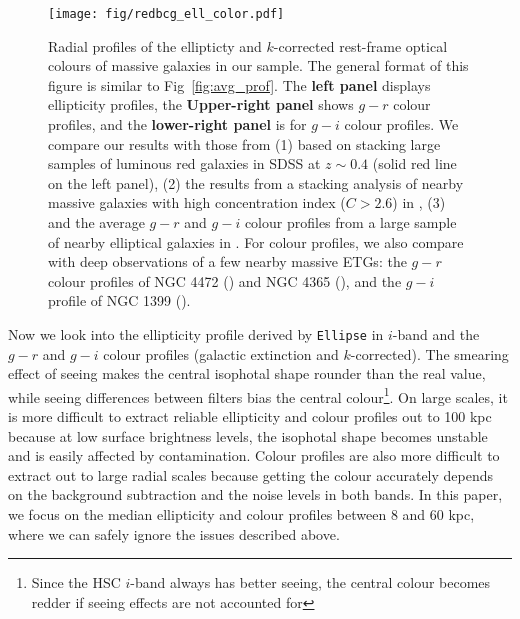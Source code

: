 \documentclass[fleqn,usenatbib]{mnras}
\begin{document}
  \begin{figure}
      \centering 
      \texttt{[image: fig/redbcg\_ell\_color.pdf]}
      \caption{
          Radial profiles of the ellipticty and $k$-corrected rest-frame optical colours 
          of massive galaxies in our sample. 
          The general format of this figure is similar to Fig~\ref{fig:avg_prof}.  
          The \textbf{left panel} displays ellipticity profiles, 
          the \textbf{Upper-right panel} shows $g-r$ colour profiles, and  the
          \textbf{lower-right panel} is for $g-i$ colour profiles. 
          We compare our results with those from (1) \citet{Tal2011} based on stacking 
          large samples of luminous red galaxies in SDSS at $z{\sim} 0.4$ 
          (solid red line on the left panel), 
          (2) the results from a stacking analysis of nearby massive 
          galaxies with high concentration index ($C>2.6$) in 
          \citet[][blue dash lines on the left and upper-right panels]{DSouza2014}, 
          (3) and the average $g-r$ and $g-i$ colour profiles 
          from a large sample of nearby elliptical galaxies in \citet[][blue, solid 
          lines on both right panels]{LaBarbera2010}.
          For colour profiles, we also compare with deep observations of a few nearby 
          massive ETGs: the $g-r$ colour profiles of NGC 4472 (\citealt{Mihos2013}) 
          and NGC 4365 (\citealt{Mihos2017}), and the $g-i$ profile of NGC 1399 
          (\citealt{Iodice2016}).
          }
      \label{fig:ell_color}
  \end{figure}
    
    
    Now we look into the ellipticity profile derived by \texttt{Ellipse} in $i$-band 
    and the $g-r$ and $g-i$ colour profiles (galactic extinction and $k$-corrected). 
	The smearing effect of seeing makes the central isophotal shape rounder than the 
	real value, while seeing differences between filters bias the central 
	colour\footnote{Since the HSC $i$-band always has better seeing, the central 
	colour becomes redder if seeing effects are not accounted for}. 
	On large scales, it is more difficult to extract reliable ellipticity and 
	colour profiles out to 100 kpc because at low surface brightness levels, the 
	isophotal shape becomes unstable and is easily affected by contamination. 
	Colour profiles are also more difficult to extract out to large radial scales
	because getting the colour accurately depends on the background subtraction and 
	the noise levels in both bands. 
	In this paper, we focus on the median ellipticity and colour profiles between 
	8 and 60 kpc, where we can safely ignore the issues described above. 
	 
\end{document}
